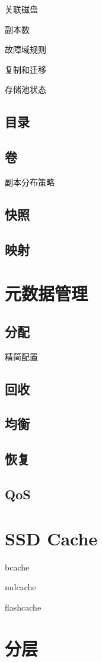 关联磁盘

副本数

故障域规则

复制和迁移

存储池状态

\subsection{目录}

\subsection{卷}

副本分布策略

\subsection{快照}

\subsection{映射}

\section{元数据管理}

\subsection{分配}

精简配置

\subsection{回收}

\subsection{均衡}

\subsection{恢复}

\subsection{QoS}

\section{SSD Cache}

bcache

mdcache

flashcache

\section{分层}

